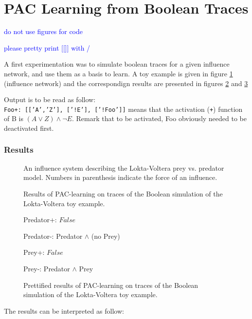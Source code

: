 \documentclass{llncs}
\newcommand{\francois}[1]{\textcolor{blue}{#1}}
\begin{document}
\section{PAC Learning from Boolean Traces}

\francois{do not use figures for code}

\francois{please pretty print [[]] with /\ \/ }

A first experimentation was to simulate boolean traces for a given influence network, and use them as a basis to learn. A toy example is given in figure \ref{bool-LV} (influence network) and the correspondign results are presented in figures \ref{bool-LV.res} and \ref{bool-LV.res.pretty}

Output is to be read as follow:\\
\texttt{Foo+:~[['A','Z'],~['!E'],~['!Foo']]} means that the activation (\texttt{+}) function of B is $(A \vee Z)\wedge\neg E$. Remark that to be activated, Foo obviously needed to be deactivated first.

\subsubsection{Results}

\begin{figure}[htp]
	
	\vspace{-1em}
	\caption{An influence system describing the Lokta-Voltera prey vs. predator model. Numbers in parenthesis indicate the force of an influence. \label{bool-LV}}
\end{figure}
\begin{figure}[htp]
	
	\vspace{-1em}
	\caption{Results of PAC-learning on traces of the Boolean simulation of the Lokta-Voltera toy example.\label{bool-LV.res}}
\end{figure}
\begin{figure}[htp]
	\ttfamily
	Predator+: $False$
	
	Predator-: Predator $\wedge$ (no Prey)
	
	Prey+: $False$
	
	Prey-: Predator $\wedge$ Prey
	\rmfamily
	\caption{Prettified results of PAC-learning on traces of the Boolean simulation of the Lokta-Voltera toy example.\label{bool-LV.res.pretty}}
\end{figure}
\pagebreak
The results can be interpreted as follow:
\end{document}
